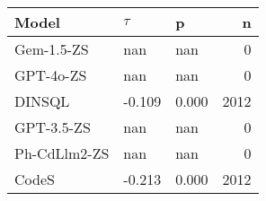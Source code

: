 \begin{tabular}{lllr}
\toprule
Model & $\tau$ & p & n \\
\midrule
Gem-1.5-ZS & nan & nan & 0 \\
GPT-4o-ZS & nan & nan & 0 \\
DINSQL & -0.109 & 0.000 & 2012 \\
GPT-3.5-ZS & nan & nan & 0 \\
Ph-CdLlm2-ZS & nan & nan & 0 \\
CodeS & -0.213 & 0.000 & 2012 \\
\bottomrule
\end{tabular}
